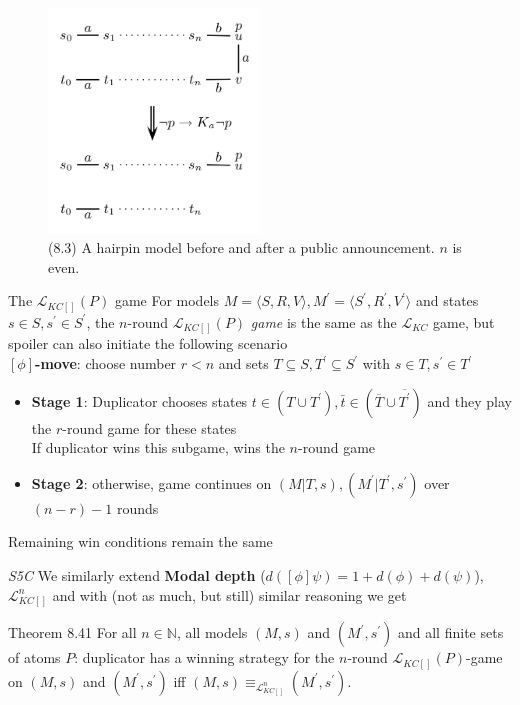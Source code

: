 \documentclass{beamer}
\newcommand{\lang}{\mathcal{L}}
\newcommand{\Mpr}{M^\prime}
\newcommand{\Spr}{S^\prime}
\newcommand{\spr}{s^\prime}
\begin{document}
\begin{frame}
	\begin{figure}[h]
		\includegraphics[width=0.5\textwidth]{figure_8_3_hairpin_model_pa}
		\caption{(8.3) A hairpin model before and after a public announcement. $n$ is even.}
	\end{figure}
\end{frame}

\begin{frame}{The $\lang_{KC[]}(P)$ game}
	For models $M = \langle S,R,V \rangle, M^\prime = \langle S^\prime,R^\prime,V^\prime \rangle$ and states $s \in S, s^\prime \in S^\prime$, the $n$-round $\lang_{KC[]}(P)$ \textit{game} is the same as the $\lang_{KC}$ game, but spoiler can also initiate the following scenario \pause
	\\[4pt]
	\textbf{$[\phi]$-move}: choose number $r<n$ and sets $T \subseteq S, T^\prime \subseteq \Spr$ with $s \in T, s^\prime \in T^\prime$
	\begin{itemize}[label=]
		\item \textbf{Stage 1}: Duplicator chooses states $t \in (T \cup T^\prime), \bar{t} \in (\overline{T} \cup \overline{T^\prime})$ and they play the $r$-round game for these states\\
			\quad If duplicator wins this subgame, wins the $n$-round game
		\item \textbf{Stage 2}: otherwise, game continues on $(M|T,s), (\Mpr|T^\prime,\spr)$ over $(n-r)-1$ rounds
	\end{itemize} \pause
	Remaining win conditions remain the same
\end{frame}

\begin{frame}{\textit{S5C}}
	We similarly extend \textbf{Modal depth} ($d([\phi] \psi) = 1 + d(\phi) + d(\psi)$), $\lang_{KC[]}^n$ and with (not as much, but still) similar reasoning we get \pause
	\begin{block}{Theorem 8.41}
		For all $n \in \mathbb{N}$, all models $(M,s)$ and $(M^\prime,s^\prime)$ and all finite sets of atoms $P$: duplicator has a winning strategy for the $n$-round $\lang_{KC[]}(P)$-game on $(M,s)$ and $(M^\prime,s^\prime)$ iff $(M,s) \equiv_{\lang_{KC[]}^n} (M^\prime,s^\prime)$.
	\end{block}
\end{frame}
\end{document}
